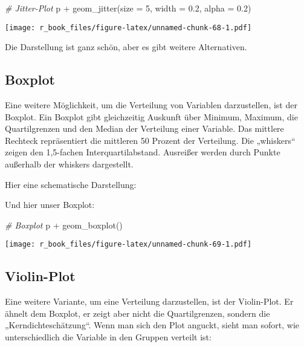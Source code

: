 \documentclass[
]{book}
\newenvironment{Shaded}{\begin{snugshade}}{\end{snugshade}}
\newcommand{\AttributeTok}[1]{\textcolor[rgb]{0.77,0.63,0.00}{#1}}
\newcommand{\CommentTok}[1]{\textcolor[rgb]{0.56,0.35,0.01}{\textit{#1}}}
\newcommand{\DecValTok}[1]{\textcolor[rgb]{0.00,0.00,0.81}{#1}}
\newcommand{\FloatTok}[1]{\textcolor[rgb]{0.00,0.00,0.81}{#1}}
\newcommand{\FunctionTok}[1]{\textcolor[rgb]{0.00,0.00,0.00}{#1}}
\newcommand{\NormalTok}[1]{#1}
\newcommand{\SpecialCharTok}[1]{\textcolor[rgb]{0.00,0.00,0.00}{#1}}
\begin{document}
\begin{Shaded}
\begin{Highlighting}[]
\CommentTok{\# Jitter{-}Plot}
\NormalTok{p }\SpecialCharTok{+} \FunctionTok{geom\_jitter}\NormalTok{(}\AttributeTok{size =} \DecValTok{5}\NormalTok{, }\AttributeTok{width =} \FloatTok{0.2}\NormalTok{, }\AttributeTok{alpha =} \FloatTok{0.2}\NormalTok{)}
\end{Highlighting}
\end{Shaded}

\texttt{[image: r\_book\_files/figure-latex/unnamed-chunk-68-1.pdf]}

Die Darstellung ist ganz schön, aber es gibt weitere Alternativen.

\hypertarget{boxplot}{%
\subsection{Boxplot}\label{boxplot}}

Eine weitere Möglichkeit, um die Verteilung von Variablen darzustellen, ist der Boxplot. Ein Boxplot gibt gleichzeitig Auskunft über Minimum, Maximum, die Quartilgrenzen und den Median der Verteilung einer Variable. Das mittlere Rechteck repräsentiert die mittleren 50 Prozent der Verteilung. Die „whiskers`` zeigen den 1,5-fachen Interquartilabstand. Ausreißer werden durch Punkte außerhalb der whiskers dargestellt.

Hier eine schematische Darstellung:

Und hier unser Boxplot:

\begin{Shaded}
\begin{Highlighting}[]
\CommentTok{\# Boxplot}
\NormalTok{p }\SpecialCharTok{+} \FunctionTok{geom\_boxplot}\NormalTok{()}
\end{Highlighting}
\end{Shaded}

\texttt{[image: r\_book\_files/figure-latex/unnamed-chunk-69-1.pdf]}

\hypertarget{violin-plot}{%
\subsection{Violin-Plot}\label{violin-plot}}

Eine weitere Variante, um eine Verteilung darzustellen, ist der Violin-Plot. Er ähnelt dem Boxplot, er zeigt aber nicht die Quartilgrenzen, sondern die „Kerndichteschätzung``. Wenn man sich den Plot anguckt, sieht man sofort, wie unterschiedlich die Variable in den Gruppen verteilt ist:
\end{document}
